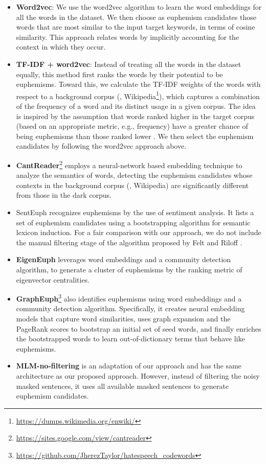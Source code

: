 \begin{itemize}%
	\item \textbf{Word2vec}: We use the word2vec algorithm \cite{mikolov2013distributed,mikolov2013efficient}  to learn the word embeddings for all the words  in the dataset. We then choose as euphemism candidates those words that are most similar to the input target keywords, in terms of  cosine similarity. This approach  relates words by implicitly accounting for the context in which they occur.
	\item \textbf{TF-IDF + word2vec}: Instead of treating all the words in the dataset equally, this method first ranks the words by their potential to be euphemisms. Toward this, we calculate the TF-IDF weights of the words \cite{manning2008introduction} with respect to a background corpus (\ie, Wikipedia\footnote{\url{https://dumps.wikimedia.org/enwiki/}}), which captures a combination of the frequency of a word and its distinct usage in a given corpus. The idea is inspired by the assumption that words ranked higher in the target corpus (based on an appropriate metric, e.g., frequency) have a greater chance of being euphemisms than those ranked lower \cite{magu2018determining}.  We then select the euphemism candidates by following the word2vec approach above.  
	\item \textbf{CantReader}\footnote{\url{https://sites.google.com/view/cantreader}} \cite{yuan2018reading} employs a neural-network based embedding technique to analyze the semantics of words, detecting the euphemism candidates whose contexts in the background corpus (\eg, Wikipedia) are significantly different from those in the dark corpus. 
	\item SentEuph \cite{felt2020recognizing} recognizes euphemisms by the use of sentiment analysis. It lists a set of euphemism candidates using a bootstrapping algorithm for semantic lexicon induction. For a fair comparison with our approach, we do not include the manual filtering stage of the algorithm proposed by Felt and Riloff \cite{felt2020recognizing}. 
	\item \textbf{EigenEuph} \cite{magu2018determining} leverages word embeddings and a community detection algorithm, to generate a cluster of euphemisms by the ranking metric of eigenvector centralities. %
	\item \textbf{GraphEuph}\footnote{\url{https://github.com/JherezTaylor/hatespeech_codewords}} \cite{taylor2017surfacing} also identifies euphemisms using word embeddings and a community detection algorithm. Specifically, it creates neural embedding models that capture word similarities, uses graph expansion and the PageRank scores \cite{page1999pagerank} to bootstrap an initial set of seed words, and finally enriches the bootstrapped words to learn out-of-dictionary terms that behave like euphemisms. 
	\item \textbf{MLM-no-filtering} is an adaptation of our approach and has the same architecture as our proposed approach. However, instead of filtering the noisy masked sentences, it uses all available masked sentences to generate euphemism candidates. 
\end{itemize}

